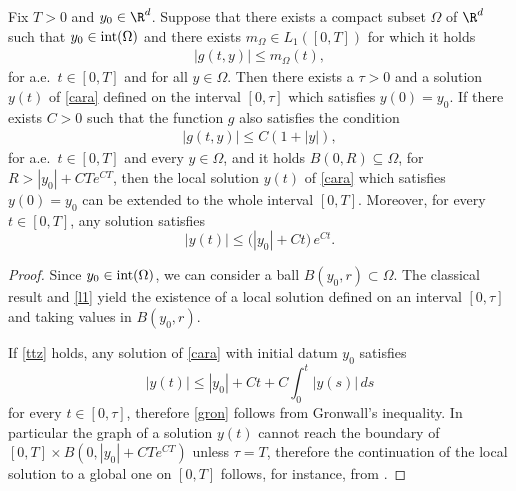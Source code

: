 \begin{theorem}\label{cara-global}
Fix $T > 0$ and $y_0 \in \R^d$. Suppose that there exists a compact subset $\Omega$ of $\R^d$ such that $y_0 \in \textup{int}(\Omega)$ and there exists $m_{\Omega} \in L_1([0,T])$ for which it holds
\begin{align}\label{l1}
|g(t,y)|\le m_{\Omega}(t),
\end{align}
for a.e.\ $t \in [0,T]$ and for all $y \in \Omega$. Then there exists a $\tau > 0$ and a solution $y(t)$ of \eqref{cara} defined on the interval $[0,\tau]$ which satisfies $y(0)=y_0$. If there exists $C > 0$ such that the function $g$ also satisfies the condition
\begin{align}\label{ttz}
|g(t,y)|\le C(1+|y|),
\end{align}
for a.e.\ $t \in [0,T]$ and every $y \in \Omega$, and it holds $B(0,R) \subseteq \Omega$, for $R > |y_0| + CT e^{CT}$, then the local solution $y(t)$ of \eqref{cara} which satisfies $y(0)=y_0$ can be extended to the whole interval $[0,T]$. Moreover, for every $t \in [0,T]$, any solution satisfies
\begin{equation}\label{gron}
|y(t)|\le \Big(|y_0|+ Ct\Big) \,e^{Ct}.
\end{equation}
\end{theorem}

\begin{proof}
Since $y_0 \in \textup{int}(\Omega)$, we can consider a ball $B(y_0,r) \subset \Omega$. The classical result \cite[Chapter 1, Theorem 1]{Fil} and \eqref{l1} yield the existence of a local solution defined on an interval $[0,\tau]$ and taking values in $B(y_0,r)$.

If \eqref{ttz} holds, any solution of \eqref{cara} with initial datum $y_0$ satisfies
$$
|y(t)|\le |y_0|+ Ct+C\int_0^t |y(s)|\,ds
$$
for every $t \in [0,\tau]$, therefore \eqref{gron} follows from Gronwall's inequality. In particular the graph of a solution $y(t)$ cannot reach the boundary of $[0,T]\times B(0,|y_0|+CTe^{CT})$ unless $\tau=T$, therefore the continuation of the local solution to a global one on $[0,T]$ follows, for instance, from \cite[Chapter 1, Theorem 4]{Fil}.
\end{proof}

